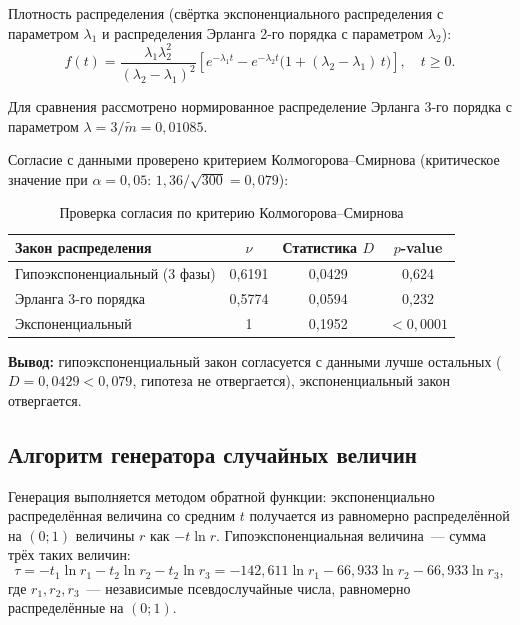 \documentclass[a4paper,12pt]{article}
\begin{document}
Плотность распределения (свёртка экспоненциального распределения с параметром $\lambda_1$ и распределения Эрланга 2-го порядка с параметром $\lambda_2$):
\begin{equation}
f(t)=\frac{\lambda_1\lambda_2^2}{(\lambda_2-\lambda_1)^2}\left[e^{-\lambda_1 t}-e^{-\lambda_2 t}\bigl(1+(\lambda_2-\lambda_1)\,t\bigr)\right],\quad t\ge0 .
\end{equation}

Для сравнения рассмотрено нормированное распределение Эрланга 3-го порядка с параметром $\lambda=3/\tilde m=0{,}01085$.

Согласие с данными проверено критерием Колмогорова--Смирнова (критическое значение при $\alpha=0{,}05$: $1{,}36/\sqrt{300}=0{,}079$):
\begin{table}[H]
\caption{Проверка согласия по критерию Колмогорова--Смирнова}
\centering
\begin{tabular}{|l|c|c|c|}
\hline
Закон распределения & $\nu$ & Статистика $D$ & $p$-value \\ \hline
Гипоэкспоненциальный (3 фазы) & 0{,}6191 & 0{,}0429 & 0{,}624 \\ \hline
Эрланга 3-го порядка & 0{,}5774 & 0{,}0594 & 0{,}232 \\ \hline
Экспоненциальный & 1 & 0{,}1952 & $<0{,}0001$ \\ \hline
\end{tabular}
\end{table}

\textbf{Вывод:} гипоэкспоненциальный закон согласуется с данными лучше остальных ($D=0{,}0429<0{,}079$, гипотеза не отвергается), экспоненциальный закон отвергается.

\subsection{Алгоритм генератора случайных величин}
Генерация выполняется методом обратной функции: экспоненциально распределённая величина со средним $t$ получается из равномерно распределённой на $(0;1)$ величины $r$ как $-t\ln r$. Гипоэкспоненциальная величина~--- сумма трёх таких величин:
\begin{equation}
\tau=-t_1\ln r_1-t_2\ln r_2-t_2\ln r_3 = -142{,}611\ln r_1-66{,}933\ln r_2-66{,}933\ln r_3,
\end{equation}
где $r_1,r_2,r_3$~--- независимые псевдослучайные числа, равномерно распределённые на $(0;1)$.
\end{document}

